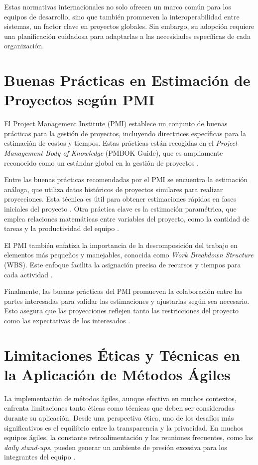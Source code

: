 Estas normativas internacionales no solo ofrecen un marco común para los equipos de desarrollo, sino que también promueven la interoperabilidad entre sistemas, un factor clave en proyectos globales. Sin embargo, su adopción requiere una planificación cuidadosa para adaptarlas a las necesidades específicas de cada organización.

\section{Buenas Prácticas en Estimación de Proyectos según PMI}
El Project Management Institute (PMI) establece un conjunto de buenas prácticas para la gestión de proyectos, incluyendo directrices específicas para la estimación de costos y tiempos. Estas prácticas están recogidas en el \textit{Project Management Body of Knowledge} (PMBOK Guide), que es ampliamente reconocido como un estándar global en la gestión de proyectos \parencite{pmi2021pmbok}.

Entre las buenas prácticas recomendadas por el PMI se encuentra la estimación análoga, que utiliza datos históricos de proyectos similares para realizar proyecciones. Esta técnica es útil para obtener estimaciones rápidas en fases iniciales del proyecto \parencite{pmi2021pmbok}. Otra práctica clave es la estimación paramétrica, que emplea relaciones matemáticas entre variables del proyecto, como la cantidad de tareas y la productividad del equipo \parencite{kerzner2017projectmanagement}.

El PMI también enfatiza la importancia de la descomposición del trabajo en elementos más pequeños y manejables, conocida como \textit{Work Breakdown Structure} (WBS). Este enfoque facilita la asignación precisa de recursos y tiempos para cada actividad \parencite{pmi2021pmbok}.

Finalmente, las buenas prácticas del PMI promueven la colaboración entre las partes interesadas para validar las estimaciones y ajustarlas según sea necesario. Esto asegura que las proyecciones reflejen tanto las restricciones del proyecto como las expectativas de los interesados \parencite{lock2020projectmanagement}.

\section{Limitaciones Éticas y Técnicas en la Aplicación de Métodos Ágiles}
La implementación de métodos ágiles, aunque efectiva en muchos contextos, enfrenta limitaciones tanto éticas como técnicas que deben ser consideradas durante su aplicación. Desde una perspectiva ética, uno de los desafíos más significativos es el equilibrio entre la transparencia y la privacidad. En muchos equipos ágiles, la constante retroalimentación y las reuniones frecuentes, como las \textit{daily stand-ups}, pueden generar un ambiente de presión excesiva para los integrantes del equipo \parencite{cockburn2001agile}.


